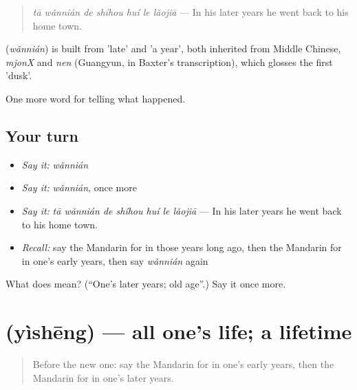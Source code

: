 \begin{quote}
\textbf{} \emph{tā wǎnnián de shíhou huí le lǎojiā} — In his later years he went back to his home town.
\end{quote}

\begin{cousinweb}
\textbf{} (\emph{wǎnnián}) is built from  'late' and  'a year', both inherited from Middle Chinese, \emph{mjonX} and \emph{nen} (Guangyun, in Baxter's transcription), which glosses the first 'dusk'.
\end{cousinweb}

\begin{grammarlens}[title={What you've built}]
One more word for telling what happened.
\end{grammarlens}

\subsection*{Your turn}
\begin{itemize}
\raggedright
  \item \emph{Say it:} \emph{wǎnnián}
  \item \emph{Say it:} \emph{wǎnnián}, once more
  \item \emph{Say it:} \emph{tā wǎnnián de shíhou huí le lǎojiā} — In his later years he went back to his home town.
  \item \emph{Recall:} say the Mandarin for in those years long ago, then the Mandarin for in one's early years, then say \emph{wǎnnián} again
\end{itemize}

\begin{tcolorbox}[breakable,colback=teal!4,colframe=teal!35!black,title={Before you move on}]
What does  mean? (\textquotedblleft{}One's later years; old age\textquotedblright{}.) Say it once more.
\end{tcolorbox}
\section[\texorpdfstring{\zh{一生} (yìshēng)}{一生 (yìshēng)}]{ (yìshēng) — all one's life; a lifetime}

\label{lesson:ZH-C322-yisheng}



\begin{quote}
Before the new one: say the Mandarin for in one's early years, then the Mandarin for in one's later years.
\end{quote}

